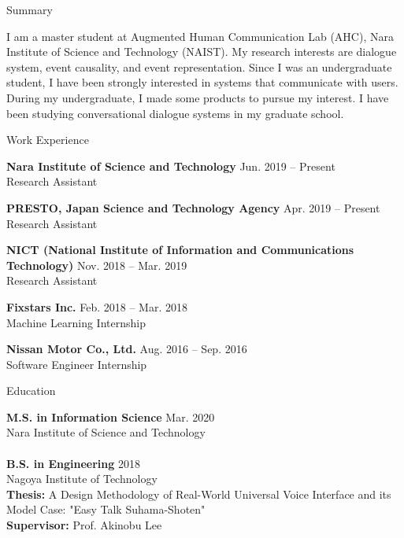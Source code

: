 \documentclass{resume} %
\begin{document}

\begin{rSection}{Summary}

I am a master student at Augmented Human Communication Lab (AHC), Nara Institute of Science and Technology (NAIST).
My research interests are dialogue system, event causality, and event representation.
Since I was an undergraduate student, I have been strongly interested in systems that communicate with users.
During my undergraduate, I made some products to pursue my interest.
I have been studying conversational dialogue systems in my graduate school.

\end{rSection}


\begin{rSection}{Work Experience}

{\bf Nara Institute of Science and Technology} \hfill {Jun. 2019 -- Present}
\\Research Assistant

{\bf PRESTO, Japan Science and Technology Agency} \hfill {Apr. 2019 -- Present}
\\Research Assistant

{\bf NICT (National Institute of Information and Communications Technology)} \hfill {Nov. 2018 -- Mar. 2019}
\\Research Assistant

{\bf Fixstars Inc.} \hfill {Feb. 2018 -- Mar. 2018}
\\Machine Learning Internship

{\bf Nissan Motor Co., Ltd.} \hfill {Aug. 2016 -- Sep. 2016}
\\Software Engineer Internship

\end{rSection}


\begin{rSection}{Education}

{\bf M.S. in Information Science} \hfill Mar. 2020 
\\ Nara Institute of Science and Technology
\\
\\{\bf B.S. in Engineering} \hfill 2018 
\\ Nagoya Institute of Technology
\\ {\bf Thesis:} A Design Methodology of Real-World Universal Voice Interface and its Model Case: "Easy Talk Suhama-Shoten"
\\ {\bf Supervisor:} Prof. Akinobu Lee

\end{rSection}
\end{document}
